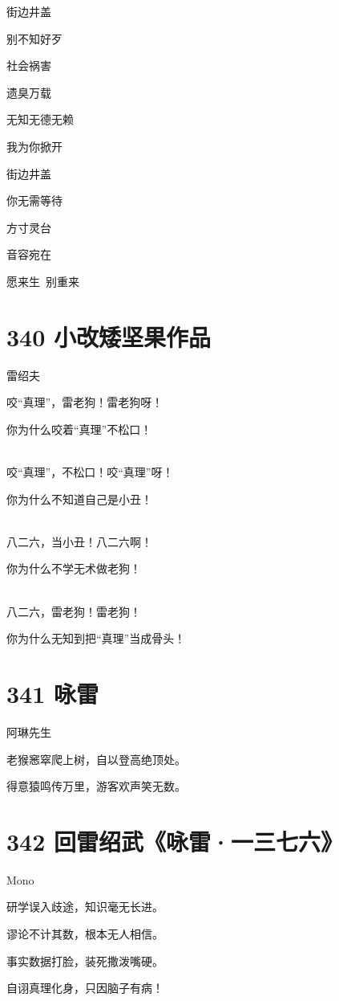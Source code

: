 \documentclass[UTF8,12pt,oneside]{ctexbook}
\def\pau#1{\begin{center} {#1} \end{center}} %
\def\poem#1#2{\section{#1}\pau{#2}} %
\begin{document}
\begin{center}
            街边井盖
            
            别不知好歹
            
            社会祸害
            
            遗臭万载
            
            无知无德无赖
            
            我为你掀开
            
            街边井盖
            
            你无需等待
            
            方寸灵台
            
            音容宛在
            
            愿来生\ 别重来
        \end{center}

        \poem{340 小改矮坚果作品}{雷绍夫}
        \begin{center}
            咬“真理”，雷老狗！雷老狗呀！

            你为什么咬着“真理”不松口！

            ~\\
            咬“真理”，不松口！咬“真理”呀！
            
            你为什么不知道自己是小丑！

            ~\\
            八二六，当小丑！八二六啊！
            
            你为什么不学无术做老狗！
            
            ~\\
            八二六，雷老狗！雷老狗！
            
            你为什么无知到把“真理”当成骨头！
        \end{center}

        \poem{341 咏雷}{阿琳先生}
        \begin{center}
            老猴窸窣爬上树，自以登高绝顶处。
            
            得意猿鸣传万里，游客欢声笑无数。
        \end{center}

        \poem{342 回雷绍武《咏雷·一三七六》}{Mono}
        \begin{center}
            研学误入歧途，知识毫无长进。
        
            谬论不计其数，根本无人相信。
            
            事实数据打脸，装死撒泼嘴硬。
            
            自诩真理化身，只因脑子有病！
        \end{center}
\end{document}
